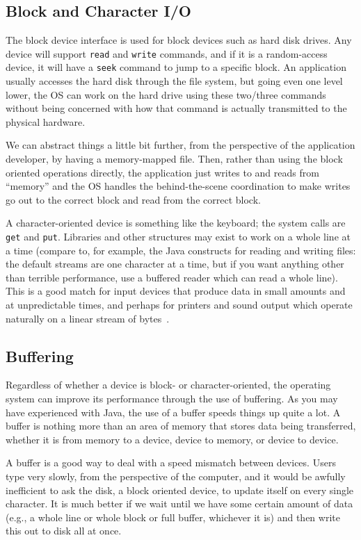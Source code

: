 \subsection*{Block and Character I/O}

The block device interface is used for block devices such as hard disk drives. Any device will support \texttt{read} and \texttt{write} commands, and if it is a random-access device, it will have a \texttt{seek} command to jump to a specific block. An application usually accesses the hard disk through the file system, but going even one level lower, the OS can work on the hard drive using these two/three commands without being concerned with how that command is actually transmitted to the physical hardware.

We can abstract things a little bit further, from the perspective of the application developer, by having a memory-mapped file. Then, rather than using the block oriented operations directly, the application just writes to and reads from ``memory'' and the OS handles the behind-the-scene coordination to make writes go out to the correct block and read from the correct block.

A character-oriented device is something like the keyboard; the system calls are \texttt{get} and \texttt{put}. Libraries and other structures may exist to work on a whole line at a time (compare to, for example, the Java constructs for reading and writing files: the default streams are one character at a time, but if you want anything other than terrible performance, use a buffered reader which can read a whole line). This is a good match for input devices that produce data in small amounts and at unpredictable times, and perhaps for printers and sound output which operate naturally on a linear stream of bytes~\cite{osc}.


\subsection*{Buffering}

Regardless of whether a device is block- or character-oriented, the operating system can improve its performance through the use of buffering. As you may have experienced with Java, the use of a buffer speeds things up quite a lot. A buffer is nothing more than an area of memory that stores data being transferred, whether it is from memory to a device, device to memory, or device to device. 

A buffer is a good way to deal with a speed mismatch between devices. Users type very slowly, from the perspective of the computer, and it would be awfully inefficient to ask the disk, a block oriented device, to update itself on every single character. It is much better if we wait until we have some certain amount of data (e.g., a whole line or whole block or full buffer, whichever it is) and then write this out to disk all at once. 

